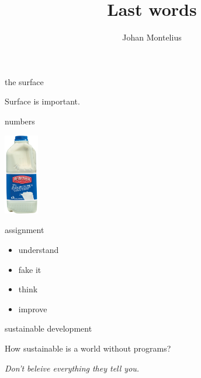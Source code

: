 

 
\title[ID1019]{Last words}

\author{Johan Montelius}
\date{\semester}



\begin{frame}
\titlepage
\end{frame}

\begin{frame}{the surface}

\begin{center}
Surface is important. 
\end{center}

\end{frame}


\begin{frame}{numbers}

\begin{center}
   \includegraphics[height=100pt]{milk.jpg}
\end{center}


\end{frame}

\begin{frame}{assignment}

\begin{center}
\begin{itemize}
\item understand
\pause
\item fake it
\pause
\item think 
\pause
\item improve
\end{itemize}
\end{center}


\end{frame}

\begin{frame}{sustainable development}

\begin{center}
How sustainable is a world without programs?
\end{center}
\pause
\vspace{80pt}
{\em Don't beleive everything they tell you.}
\end{frame}




